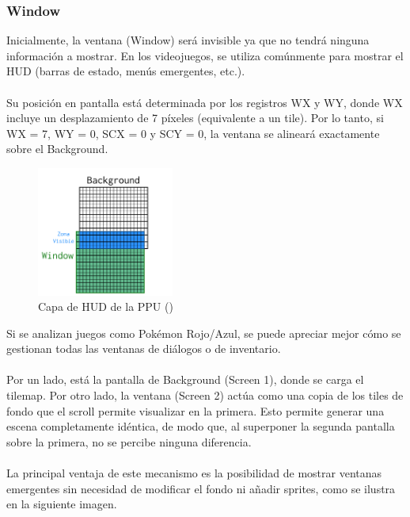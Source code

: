 \subsubsection{Window}

Inicialmente, la ventana (Window) será invisible ya que no tendrá ninguna información a mostrar. En los videojuegos, se utiliza comúnmente para mostrar el HUD (barras de estado, menús emergentes, etc.).
\\\\
Su posición en pantalla está determinada por los registros WX y WY, donde WX incluye un desplazamiento de 7 píxeles (equivalente a un tile). Por lo tanto, si WX = 7, WY = 0, SCX = 0 y SCY = 0, la ventana se alineará exactamente sobre el Background.

\begin{figure}[H]
    \centering
    \includegraphics[width=0.4\textwidth]{include/images/grid_window.png}
    \caption{Capa de HUD de la PPU (\cite{gbedg})}
    \label{figure:window_layer}
\end{figure}

Si se analizan juegos como Pokémon Rojo/Azul, se puede apreciar mejor cómo se gestionan todas las ventanas de diálogos o de inventario.
\\\\
Por un lado, está la pantalla de Background (Screen 1), donde se carga el tilemap. Por otro lado, la ventana (Screen 2) actúa como una copia de los tiles de fondo que el scroll permite visualizar en la primera. Esto permite generar una escena completamente idéntica, de modo que, al superponer la segunda pantalla sobre la primera, no se percibe ninguna diferencia.
\\\\
La principal ventaja de este mecanismo es la posibilidad de mostrar ventanas emergentes sin necesidad de modificar el fondo ni añadir sprites, como se ilustra en la siguiente imagen.

